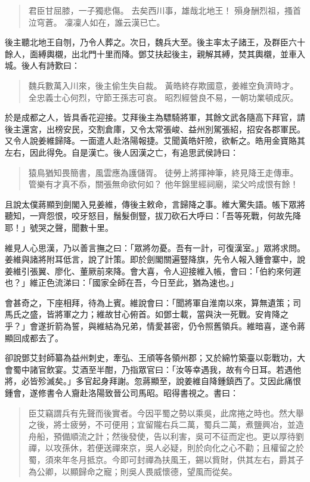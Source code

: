 \begin{quote}
君臣甘屈膝，一子獨悲傷。
去矣西川事，雄哉北地王！
殞身酬烈祖，搔首泣穹蒼。
凜凜人如在，誰云漢已亡。
\end{quote}

後主聽北地王自刎，乃令人葬之。次日，魏兵大至。後主率太子諸王，及群臣六十餘人，面縛輿櫬，出北門十里而降。鄧艾扶起後主，親解其縛，焚其輿櫬，並車入城。後人有詩歎曰：

\begin{quote}
魏兵數萬入川來，後主偷生失自裁。
黃皓終存欺國意，姜維空負濟時才。
全忠義士心何烈，守節王孫志可哀。
昭烈經營良不易，一朝功業頓成灰。
\end{quote}

於是成都之人，皆具香花迎接。艾拜後主為驃騎將軍，其餘文武各隨高下拜官，請後主還宮，出榜安民，交割倉庫，又令太常張峻、益州別駕張紹，招安各郡軍民。又令人說姜維歸降。一面遣人赴洛陽報捷。艾聞黃皓奸險，欲斬之。皓用金寶賂其左右，因此得免。自是漢亡。後人因漢之亡，有追思武侯詩曰：

\begin{quote}
猿鳥猶知畏簡書，風雲應為護儲胥。
徒勞上將揮神筆，終見降王走傳車。
管樂有才真不忝，關張無命欲何如？
他年錦里經祠廟，梁父吟成恨有餘！
\end{quote}

且說太僕蔣顯到劍閣入見姜維，傳後主敕命，言歸降之事。維大驚失語。帳下眾將聽知，一齊怨恨，咬牙怒目，鬚髮倒豎，拔刀砍石大呼曰：「吾等死戰，何故先降耶！」號哭之聲，聞數十里。

維見人心思漢，乃以善言撫之曰：「眾將勿憂。吾有一計，可復漢室。」眾將求問。姜維與諸將附耳低言，說了計策。即於劍閣關遍豎降旗，先令人報入鍾會寨中，說姜維引張翼、廖化、董厥前來降。會大喜，令人迎接維入帳，會曰：「伯約來何遲也？」維正色流涕曰：「國家全師在吾，今日至此，猶為速也。」

會甚奇之，下座相拜，待為上賓。維說會曰：「聞將軍自淮南以來，算無遺策；司馬氏之盛，皆將軍之力；維故甘心俯首。如鄧士載，當與決一死戰。安肯降之乎？」會遂折箭為誓，與維結為兄弟，情愛甚密，仍令照舊領兵。維暗喜，遂令蔣顯回成都去了。

卻說鄧艾封師纂為益州刺史，牽弘、王頎等各領州郡；又於綿竹築臺以彰戰功，大會蜀中諸官飲宴。艾酒至半酣，乃指眾官曰：「汝等幸遇我，故有今日耳。若遇他將，必皆殄滅矣。」多官起身拜謝。忽蔣顯至，說姜維自降鍾鎮西了。艾因此痛恨鍾會，遂修書令人齎赴洛陽致晉公司馬昭。昭得書視之。書曰：

\begin{quote}
臣艾竊謂兵有先聲而後實者。今因平蜀之勢以乘吳，此席捲之時也。然大舉之後，將士疲勞，不可便用；宜留隴右兵二萬，蜀兵二萬，煮鹽興冶，並造舟船，預備順流之計；然後發使，告以利害，吳可不征而定也。更以厚待劉禪，以攻孫休，若便送禪來京，吳人必疑，則於向化之心不勸；且權留之於蜀，須來年冬月抵京。今即可封禪為扶風王，錫以貲財，供其左右，爵其子為公卿，以顯歸命之寵；則吳人畏威懷德，望風而從矣。
\end{quote}


